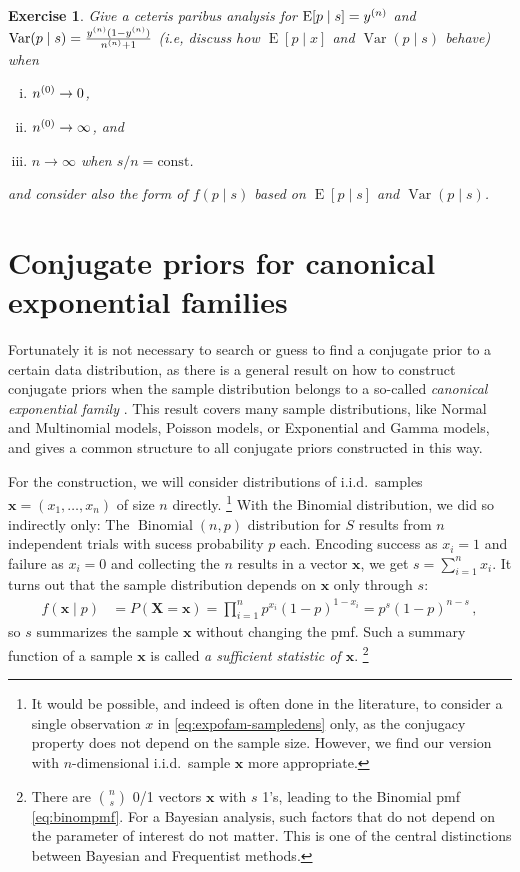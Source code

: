 \documentclass[12pt,a4paper	,twoside]{article}
\newcommand{\bs}[1]{\boldsymbol{#1}}
\renewcommand{\vec}[1]{{\bs#1}}
\newcommand{\E}{\operatorname{E}}
\newcommand{\V}{\operatorname{Var}}
\newcommand{\bin}{\operatorname{Binomial}}
\newtheorem{myex}{Exercise}
\begin{document}
\begin{myex}
Give a ceteris paribus analysis for $\E[p\mid s] = \yn$ and $\V(p\mid s) = \frac{\yn (1-\yn)}{\nn + 1}$
(i.e, discuss how $\E[p\mid x]$ and $\V(p\mid s)$ behave) when
\begin{enumerate}[(i)]
\item $n^{(0)} \to 0$,
\item $n^{(0)} \to \infty$, and
\item $n\to \infty$ when $s/n = \text{const}$.
\end{enumerate}
and consider also the form of $f(p\mid s)$ based on $\E[p\mid s]$ and $\V(p\mid s)$.
\end{myex}


\section{Conjugate priors for canonical exponential families}

Fortunately it is not necessary to search or guess to find a conjugate prior to a certain data distribution,
as there is a general result on how to construct conjugate priors
when the sample distribution belongs to a so-called \emph{canonical exponential family}
\cite[e.g.,][pp.~202 and 272f]{2000:bernardosmith}. %
This result covers many sample distributions, %
like Normal and Multinomial models, Poisson models, or Exponential and Gamma models,
and gives a common structure to all conjugate priors constructed in this way.

For the construction, we will consider distributions of i.i.d.\ samples $\vec{x} = (x_1,\ldots,x_n)$ of size $n$ directly.%
\footnote{\label{foot:dataisplural}It would be possible, and indeed is often done in the literature,
to consider a single observation $x$ in \eqref{eq:expofam-sampledens} only,
as the conjugacy property does not depend on the sample size.
However, we find our version with $n$-dimensional i.i.d.\ sample $\vec{x}$
more appropriate.} %
With the Binomial distribution, we did so indirectly only:
The $\bin(n,p)$ distribution for $S$ results from $n$ independent trials with sucess probability $p$ each.
Encoding success as $x_i=1$ and failure as $x_i=0$ and collecting the $n$ results in a vector $\vec{x}$,
we get $s =\sum_{i=1}^n x_i$.
It turns out that the sample distribution depends on $\vec{x}$ only through $s$:
\begin{align}
f(\vec{x} \mid p) &= P(\vec{X} = \vec{x}) = \prod_{i=1}^n p^{x_i} (1-p)^{1-x_i} = p^s (1-p)^{n-s}\,,
\end{align}
so $s$ summarizes the sample $\vec{x}$ without changing the pmf.
Such a summary function of a sample $\vec{x}$ is called \emph{a sufficient statistic of $\vec{x}$}.%
\footnote{There are $\binom{n}{s}$ 0/1 vectors $\vec{x}$ with $s$ 1's, leading to the Binomial pmf \eqref{eq:binompmf}.
For a Bayesian analysis, such factors that do not depend on the parameter of interest do not matter.
This is one of the central distinctions between Bayesian and Frequentist methods.}
\end{document}
